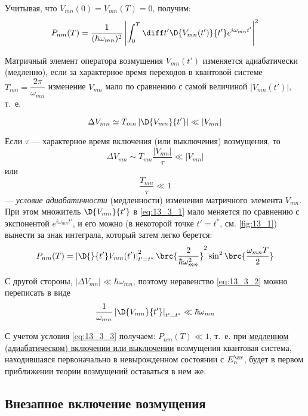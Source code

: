 Учитывая, что $V_{mn}(0) = V_{mn}(T) = 0$, получим:
\begin{equation}
\label{eq:13_3_1}
P_{nm}(T) = \frac{1}{(\hbar \omega_{mn})^2} \left| \int_0^T \diff t' \D{V_{mn}(t')}{t'} e^{i\omega_{mn}t'}\right|^2
\end{equation}

\begin{defn}
Матричный элемент оператора возмущения $V_{mn}(t')$ изменяется адиабатически (медленно), если за характерное время переходов в квантовой системе $T_{mn} = \dfrac{2\pi}{\omega_{mn}}$ изменение $V_{mn}$ мало по сравнению с самой величиной $|V_{mn}(t')|$, т.~е.
\end{defn}
\begin{equation}
\label{eq:13_3_2}
\Delta V_{mn}  \simeq T_{mn} \left| \D{V_{mn}}{t'}\right| \ll |V_{mn}|
\end{equation}

Если $\tau$ --- характерное время включения (или выключения) возмущения, то
$$
\Delta V_{mn} \sim T_{mn} \frac{|V_{mn}|}{\tau} \ll |V_{mn}| 
$$
или
$$
\boxed{\frac{T_{mn}}{\tau} \ll 1}
$$
--- {\em условие адиабатичности} (медленности) изменения матричного элемента $V_{mn}$. При этом множитель $\D{V_{mn}}{t'}$ в \eqref{eq:13_3_1} мало меняется по сравнению с экспонентой $e^{i\omega_{mn} t'}$, и его можно (в некоторой точке $t' = t^*$, см. \autoref{fig:13_1}) вынести за знак интеграла, который затем легко берется:
$$
P_{nm}(T) = \left| \D{}{t'} V_{mn}(t')\right|_{t' = t^*}^2 \brc{\frac{2}{\hbar \omega_{mn}^2}}^2 \sin^2 \brc{\frac{\omega_{mn}T}{2}}
$$

С другой стороны, $|\Delta V_{mn}| \ll \hbar \omega_{mn}$, поэтому неравенство \eqref{eq:13_3_2} можно переписать в виде
\begin{equation}
\label{eq:13_3_3}
\frac{1}{\omega_{mn}} \left| \D{V_{mn}}{t'}\right|_{t' = t^*} \ll \hbar \omega_{mn}
\end{equation}

С учетом условия \eqref{eq:13_3_3} получаем: $\boxed{P_{nm}(T) \ll 1}$, т.~е. при \underline{медленном (адиабатическом) включении или выключении} возмущения квантовая система, находившаяся первоначально в невырожденном состоянии с $E_n^\zr$, будет в первом приближении теории возмущений оставаться в нем же.

\subsection{Внезапное включение возмущения}

